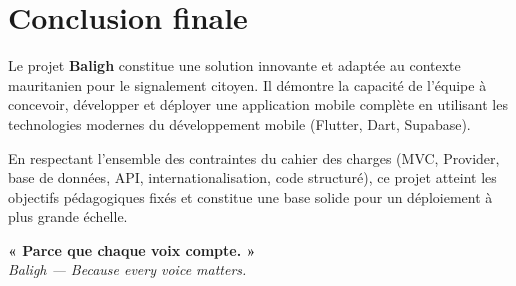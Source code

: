 \documentclass[12pt,a4paper]{report}
\begin{document}
\section{Conclusion finale}

Le projet \textbf{Baligh} constitue une solution innovante et adaptée au contexte mauritanien pour le signalement citoyen. Il démontre la capacité de l'équipe à concevoir, développer et déployer une application mobile complète en utilisant les technologies modernes du développement mobile (Flutter, Dart, Supabase).

En respectant l'ensemble des contraintes du cahier des charges (MVC, Provider, base de données, API, internationalisation, code structuré), ce projet atteint les objectifs pédagogiques fixés et constitue une base solide pour un déploiement à plus grande échelle.

\begin{center}
    \vspace{1cm}
    \textbf{« Parce que chaque voix compte. »} \\
    \textit{Baligh --- Because every voice matters.}
    \vspace{1cm}
\end{center}

\end{document}

